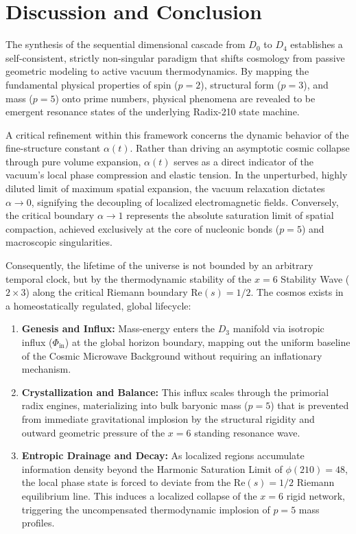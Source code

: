 \documentclass[twocolumn]{aa}
\begin{document}
\section{Discussion and Conclusion}
\label{sec:discussion_conclusion}

The synthesis of the sequential dimensional cascade from $D_0$ to $D_4$ establishes a self-consistent, strictly non-singular paradigm that shifts cosmology from passive geometric modeling to active vacuum thermodynamics. By mapping the fundamental physical properties of spin ($p=2$), structural form ($p=3$), and mass ($p=5$) onto prime numbers, physical phenomena are revealed to be emergent resonance states of the underlying Radix-210 state machine. 

A critical refinement within this framework concerns the dynamic behavior of the fine-structure constant $\alpha(t)$. Rather than driving an asymptotic cosmic collapse through pure volume expansion, $\alpha(t)$ serves as a direct indicator of the vacuum's local phase compression and elastic tension. In the unperturbed, highly diluted limit of maximum spatial expansion, the vacuum relaxation dictates $\alpha \rightarrow 0$, signifying the decoupling of localized electromagnetic fields. Conversely, the critical boundary $\alpha \rightarrow 1$ represents the absolute saturation limit of spatial compaction, achieved exclusively at the core of nucleonic bonds ($p=5$) and macroscopic singularities.

Consequently, the lifetime of the universe is not bounded by an arbitrary temporal clock, but by the thermodynamic stability of the $x=6$ Stability Wave ($2 \times 3$) along the critical Riemann boundary $\text{Re}(s) = 1/2$. The cosmos exists in a homeostatically regulated, global lifecycle:
\begin{enumerate}
    \item \textbf{Genesis and Influx:} Mass-energy enters the $D_3$ manifold via isotropic influx ($\Phi_{\text{in}}$) at the global horizon boundary, mapping out the uniform baseline of the Cosmic Microwave Background without requiring an inflationary mechanism.
    \item \textbf{Crystallization and Balance:} This influx scales through the primorial radix engines, materializing into bulk baryonic mass ($p=5$) that is prevented from immediate gravitational implosion by the structural rigidity and outward geometric pressure of the $x=6$ standing resonance wave.
    \item \textbf{Entropic Drainage and Decay:} As localized regions accumulate information density beyond the Harmonic Saturation Limit of $\phi(210)=48$, the local phase state is forced to deviate from the $\text{Re}(s) = 1/2$ Riemann equilibrium line. This induces a localized collapse of the $x=6$ rigid network, triggering the uncompensated thermodynamic implosion of $p=5$ mass profiles. 
\end{enumerate}
\end{document}
